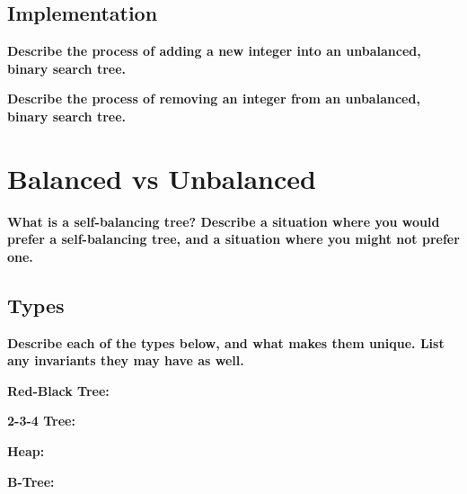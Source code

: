 \documentclass[12pt, letterpaper]{article}
\newcommand{\question}[2][4em]{\textbf{#2}\vspace{#1}\par}
\begin{document}
\subsection{Implementation}

\question{Describe the process of adding a new integer into an unbalanced,
binary search tree.}

\question{Describe the process of removing an integer from an unbalanced,
binary search tree.}

\pagebreak
\section{Balanced vs Unbalanced}

\question{What is a self-balancing tree? Describe a situation where you would
prefer a self-balancing tree, and a situation where you might not prefer one.}

\subsection{Types}

\textbf{Describe each of the types below, and what makes them unique. List any
invariants they may have as well.}

\question{Red-Black Tree:}

\question{2-3-4 Tree:}

\question{Heap:}

\question{B-Tree:}
\end{document}
